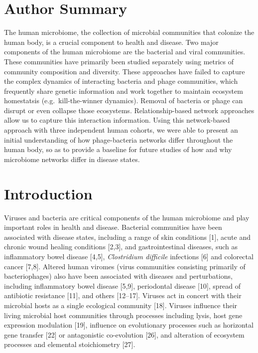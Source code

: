 \documentclass[12pt,]{article}
\begin{document}
\newpage

\section{Author Summary}\label{author-summary}

The human microbiome, the collection of microbial communities that
colonize the human body, is a crucial component to health and disease.
Two major components of the human microbiome are the bacterial and viral
communities. These communities have primarily been studied separately
using metrics of community composition and diversity. These approaches
have failed to capture the complex dynamics of interacting bacteria and
phage communities, which frequently share genetic information and work
together to maintain ecosystem homestatsis (e.g.~kill-the-winner
dynamics). Removal of bacteria or phage can disrupt or even collapse
those ecosystems. Relationship-based network approaches allow us to
capture this interaction information. Using this network-based approach
with three independent human cohorts, we were able to present an initial
understanding of how phage-bacteria networks differ throughout the human
body, so as to provide a baseline for future studies of how and why
microbiome networks differ in disease states.

\newpage

\section{Introduction}\label{introduction}

Viruses and bacteria are critical components of the human microbiome and
play important roles in health and disease. Bacterial communities have
been associated with disease states, including a range of skin
conditions {[}1{]}, acute and chronic wound healing conditions
{[}2,3{]}, and gastrointestinal diseases, such as inflammatory bowel
disease {[}4,5{]}, \emph{Clostridium difficile} infections {[}6{]} and
colorectal cancer {[}7,8{]}. Altered human viromes (virus communities
consisting primarily of bacteriophages) also have been associated with
diseases and perturbations, including inflammatory bowel disease
{[}5,9{]}, periodontal disease {[}10{]}, spread of antibiotic resistance
{[}11{]}, and others {[}12--17{]}. Viruses act in concert with their
microbial hosts as a single ecological community {[}18{]}. Viruses
influence their living microbial host communities through processes
including lysis, host gene expression modulation {[}19{]}, influence on
evolutionary processes such as horizontal gene transfer {[}22{]} or
antagonistic co-evolution {[}26{]}, and alteration of ecosystem
processes and elemental stoichiometry {[}27{]}.
\end{document}
